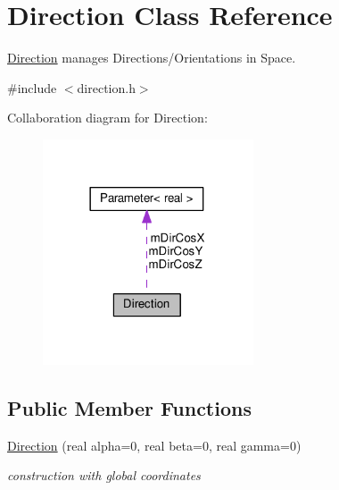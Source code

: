 \hypertarget{classDirection}{}\section{Direction Class Reference}
\label{classDirection}


\hyperlink{classDirection}{Direction} manages Directions/\+Orientations in Space.  




{\ttfamily \#include $<$direction.\+h$>$}



Collaboration diagram for Direction\+:
\nopagebreak
\begin{figure}[H]
\begin{center}
\leavevmode
\includegraphics[width=177pt]{classDirection__coll__graph}
\end{center}
\end{figure}
\subsection*{Public Member Functions}
\begin{DoxyCompactItemize}
\item 
\hyperlink{classDirection_a735f451ae07927d4bb8b4631b5e53c0a}{Direction} (real alpha=0, real beta=0, real gamma=0)
\begin{DoxyCompactList}\small\item\em construction with global coordinates \end{DoxyCompactList}\end{DoxyCompactItemize}
